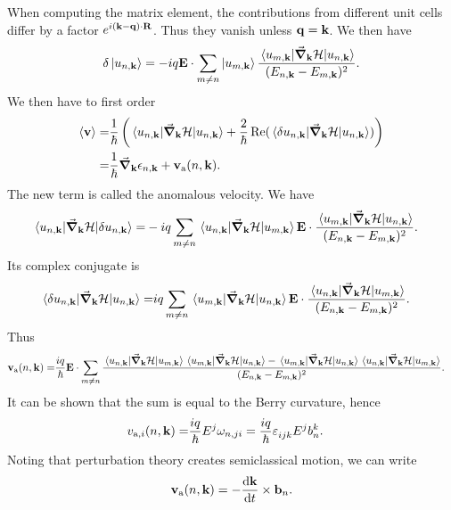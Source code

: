 When computing the matrix element, the contributions from different unit cells differ by a factor $e^{i(\vb{k} - \vb{q})\cdot\vb{R}}$. Thus they vanish unless $\vb{q} = \vb{k}$. We then have
\begin{align*}
	\delta\ket{u_{n, \vb{k}}} = -iq\vb{E}\cdot\sum\limits_{m\neq n}\ket{u_{m, \vb{k}}}\frac{\mel{u_{m, \vb{k}}}{\grad_{\vb{k}}\ensuremath{\mathcal{H}}}{u_{n, \vb{k}}}}{(E_{n, \vb{k}} - E_{m, \vb{k}})^{2}}.
\end{align*}
We then have to first order
\begin{align*}
	\expval{\vb{v}} =& \frac{1}{\hbar}\left(\expval{\grad_{\vb{k}}\ensuremath{\mathcal{H}}}{u_{n, \vb{k}}} + \frac{2}{\hbar}\Re(\mel{\delta u_{n, \vb{k}}}{\grad_{\vb{k}}\ensuremath{\mathcal{H}}}{u_{n, \vb{k}}})\right) \\
	                =& \frac{1}{\hbar}\grad_{\vb{k}}\epsilon_{n, \vb{k}} + \vb{v}_{\text{a}}(n, \vb{k}).
\end{align*}
The new term is called the anomalous velocity. We have
\begin{align*}
	\mel{u_{n, \vb{k}}}{\grad_{\vb{k}}\ensuremath{\mathcal{H}}}{\delta u_{n, \vb{k}}} =&  -iq\sum\limits_{m\neq n}\mel{u_{n, \vb{k}}}{\grad_{\vb{k}}\ensuremath{\mathcal{H}}}{u_{m, \vb{k}}}\vb{E}\cdot\frac{\mel{u_{m, \vb{k}}}{\grad_{\vb{k}}\ensuremath{\mathcal{H}}}{u_{n, \vb{k}}}}{(E_{n, \vb{k}} - E_{m, \vb{k}})^{2}}.
\end{align*}
Its complex conjugate is
\begin{align*}
	\mel{\delta u_{n, \vb{k}}}{\grad_{\vb{k}}\ensuremath{\mathcal{H}}}{u_{n, \vb{k}}} =&  iq\sum\limits_{m\neq n}\mel{u_{m, \vb{k}}}{\grad_{\vb{k}}\ensuremath{\mathcal{H}}}{u_{n, \vb{k}}}\vb{E}\cdot\frac{\mel{u_{n, \vb{k}}}{\grad_{\vb{k}}\ensuremath{\mathcal{H}}}{u_{m, \vb{k}}}}{(E_{n, \vb{k}} - E_{m, \vb{k}})^{2}}.
\end{align*}
Thus
\begin{align*}
	\vb{v}_{\text{a}}(n, \vb{k}) =& \frac{iq}{\hbar}\vb{E}\cdot\sum\limits_{m\neq n}\frac{\mel{u_{n, \vb{k}}}{\grad_{\vb{k}}\ensuremath{\mathcal{H}}}{u_{m, \vb{k}}}\mel{u_{m, \vb{k}}}{\grad_{\vb{k}}\ensuremath{\mathcal{H}}}{u_{n, \vb{k}}} - \mel{u_{m, \vb{k}}}{\grad_{\vb{k}}\ensuremath{\mathcal{H}}}{u_{n, \vb{k}}}\mel{u_{n, \vb{k}}}{\grad_{\vb{k}}\ensuremath{\mathcal{H}}}{u_{m, \vb{k}}}}{(E_{n, \vb{k}} - E_{m, \vb{k}})^{2}}.
\end{align*}
It can be shown that the sum is equal to the Berry curvature, hence
\begin{align*}
	v_{\text{a}, i}(n, \vb{k}) =& \frac{iq}{\hbar}E^{j}\omega_{n, ji} = \frac{iq}{\hbar}\leci{}{ijk}E^{j}b_{n}^{k}.
\end{align*}
Noting that perturbation theory creates semiclassical motion, we can write
\begin{align*}
	\vb{v}_{\text{a}}(n, \vb{k}) = -\dv{\vb{k}}{t}\times\vb{b}_{n}.
\end{align*}
